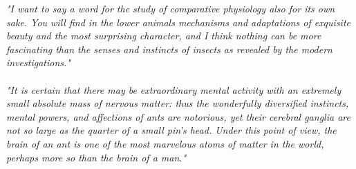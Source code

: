 \vspace*{4cm}
\textit{"I want to say a word for the study of comparative physiology also for its own sake. You will find in the lower animals mechanisms and adaptations of exquisite beauty and the most surprising character, and I think nothing can be more fascinating than the senses and instincts of insects as revealed by the modern investigations."} \\
\newline
{} \\
\vspace{2cm}
\newline
\textit{"It is certain that there may be extraordinary mental activity with an extremely small absolute mass of nervous matter: thus the wonderfully diversified instincts, mental powers, and affections of ants are notorious, yet their cerebral ganglia are not so large as the quarter of a small pin's head. Under this point of view, the brain of an ant is one of the most marvelous atoms of matter in the world, perhaps more so than the brain of a man."} \\
\newline
{}
\vspace{3.8cm}


